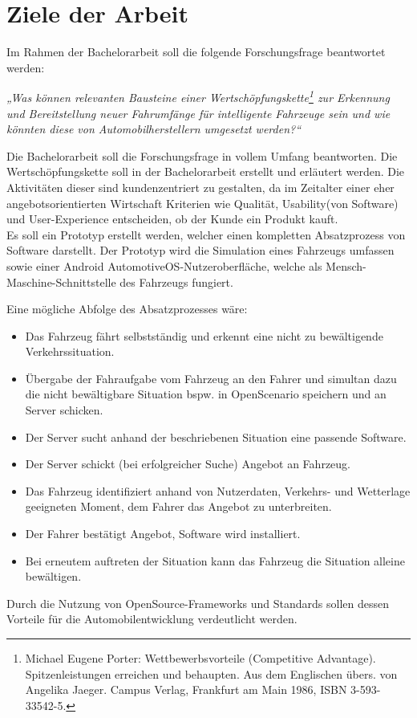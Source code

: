 \documentclass{article}
\begin{document}
\section{Ziele der Arbeit}
Im Rahmen der Bachelorarbeit soll die folgende Forschungsfrage beantwortet werden:
\begin{center}
	\textit{„Was können relevanten Bausteine einer Wertschöpfungskette\footnote{ Michael Eugene Porter: Wettbewerbsvorteile (Competitive Advantage). Spitzenleistungen erreichen und behaupten. Aus dem Englischen übers. von Angelika Jaeger. Campus Verlag, Frankfurt am Main 1986, ISBN 3-593-33542-5.} zur Erkennung und Bereitstellung neuer Fahrumfänge für intelligente Fahrzeuge sein und wie könnten diese von Automobilherstellern umgesetzt werden?“}
\end{center}
Die Bachelorarbeit soll die Forschungsfrage in vollem Umfang beantworten. Die Wertschöpfungskette soll in der Bachelorarbeit erstellt und erläutert werden. Die Aktivitäten dieser sind kundenzentriert zu gestalten, da im Zeitalter einer eher angebotsorientierten Wirtschaft Kriterien wie Qualität, Usability(von Software) und User-Experience entscheiden, ob der Kunde ein Produkt kauft.\\
Es soll ein Prototyp erstellt werden, welcher einen kompletten Absatzprozess von Software darstellt. Der Prototyp wird die Simulation eines Fahrzeugs umfassen sowie einer Android AutomotiveOS-Nutzeroberfläche, welche als Mensch-Maschine-Schnittstelle des Fahrzeugs fungiert. 

Eine mögliche Abfolge des Absatzprozesses wäre:
\begin{itemize}
	\item[1.] Das Fahrzeug fährt selbstständig und erkennt eine nicht zu bewältigende Verkehrssituation.
	\item[2.] Übergabe der Fahraufgabe vom Fahrzeug an den Fahrer und simultan dazu die nicht bewältigbare Situation bspw. in OpenScenario speichern und an Server schicken.
	\item[3.] Der Server sucht anhand der beschriebenen Situation eine passende Software.
	\item[4.] Der Server schickt (bei erfolgreicher Suche) Angebot an Fahrzeug.
	\item[5.] Das Fahrzeug identifiziert anhand von Nutzerdaten, Verkehrs- und Wetterlage geeigneten Moment, dem Fahrer das Angebot zu unterbreiten.
	\item[6.] Der Fahrer bestätigt Angebot, Software wird installiert.
	\item[7.] Bei erneutem auftreten der Situation kann das Fahrzeug die Situation alleine bewältigen.
\end{itemize}
Durch die Nutzung von OpenSource-Frameworks und Standards sollen dessen Vorteile für die Automobilentwicklung verdeutlicht werden.
\end{document}

